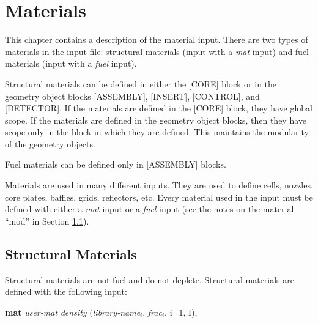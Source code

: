 %
%
\section{Materials}  \label{chap:materials}

This chapter contains a description of the material input. There are two types of materials
in the input file: structural materials (input with a {\it mat} input) and fuel materials
(input with a {\it fuel} input).

Structural materials can be defined in either the [CORE] block or in the
geometry object blocks [ASSEMBLY], [INSERT], [CONTROL], and [DETECTOR].
If the materials are defined in the [CORE] block, they have global scope.
If the materials are defined in the geometry object blocks, then they have
scope only in the block in which they are defined.
This maintains the modularity of the geometry objects.

Fuel materials can be defined only in [ASSEMBLY] blocks.

Materials are used in many different inputs. They are used to define
cells, nozzles, core plates, baffles, grids, reflectors, etc. Every material
used in the input must be defined with either a {\it mat} input or a {\it fuel} input
(see the notes on the material ``mod'' in Section \ref{sec:structural-materials}).

\subsection{Structural Materials}\label{sec:structural-materials}

Structural materials are not fuel and do not deplete. Structural
materials are defined with the following input:

{\bf mat} {\it user-mat} {\it density} ({\it library-name$_i$}, {\it frac$_i$}, i=1, I),

